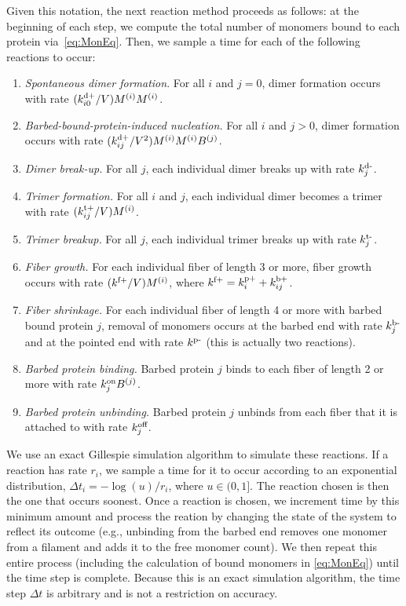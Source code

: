 \documentclass[11pt]{article}
\renewcommand{\i}[1]{{#1}^{(i)}}
\renewcommand{\j}[1]{{#1}^{(j)}}
\newcommand{\z}[1]{{#1}^{(0)}}
\begin{document}
\begin{appendices}
Given this notation, the next reaction method proceeds as follows: at the beginning of each step, we compute the total number of monomers bound to each protein via\ \eqref{eq:MonEq}. Then, we sample a time for each of the following reactions to occur:
\begin{enumerate}
\item \emph{Spontaneous dimer formation}. For all $i$ and $j=0$, dimer formation occurs with rate $(\kdp_{i0}/V)\i M \i M$. %
\item \emph{Barbed-bound-protein-induced nucleation.} For all $i$ and $j> 0$, dimer formation occurs with rate $(\kdp_{ij}/V^2)\i M \i M \j B$. %
\item \emph{Dimer break-up.} For all $j$, each individual dimer breaks up with rate $k^\text{d-}_j$. %
\item \emph{Trimer formation.} For all $i$ and $j$, each individual dimer becomes a trimer with rate $(\ktrp_{ij}/V)\i M$.
\item \emph{Trimer breakup.} For all $j$, each individual trimer breaks up with rate $k^\text{t-}_j$.
\item \emph{Fiber growth.} For each individual fiber of length 3 or more, fiber growth occurs with rate $(\kfp/V) \i M$, where $k^\text{f+}=k^\text{p+}_i+k^\text{b+}_{ij}$.
\item \emph{Fiber shrinkage.} For each individual fiber of length 4 or more with barbed bound protein $j$, removal of monomers occurs at the barbed end with rate $k^\text{b-}_j$ and at the pointed end with rate $k^\text{p-}$ (this is actually two reactions). 
\item \emph{Barbed protein binding.} Barbed protein $j$ binds to each fiber of length 2 or more with rate $\kon_j  \j B$. 
\item \emph{Barbed protein unbinding.} Barbed protein $j$ unbinds from each fiber that it is attached to with rate $k^\text{off}_j$.
\end{enumerate}
We use an exact Gillespie simulation algorithm \cite{gillespie2007stochastic} to simulate these reactions. If a reaction has rate $r_i$, we sample a time for it to occur according to an exponential distribution, $\Delta t_i=-\log(u)/r_i$, where $u \in (0,1]$. The reaction chosen is then the one that occurs soonest. Once a reaction is chosen, we increment time by this minimum amount and process the reation by changing the state of the system to reflect its outcome (e.g., unbinding from the barbed end removes one monomer from a filament and adds it to the free monomer count). We then repeat this entire process (including the calculation of bound monomers in \eqref{eq:MonEq}) until the time step is complete. Because this is an exact simulation algorithm, the time step $\Delta t$ is arbitrary and is not a restriction on accuracy.


\end{appendices}
\end{document}
